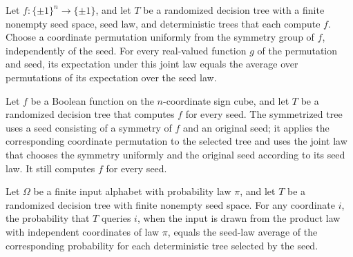 \begin{theorem}
\label{FABL.RandomizedDecisionTree.pmfExpectation_symmetrizedSeedLaw}
\leanok
{}
Let $f:\{\pm1\}^n\to\{\pm1\}$, and let $T$ be a randomized decision tree with a finite
nonempty seed space, seed law, and deterministic trees that each compute $f$. Choose a
coordinate permutation uniformly from the symmetry group of $f$, independently of the
seed. For every real-valued function $g$ of the permutation and seed, its expectation
under this joint law equals the average over permutations of its expectation over the
seed law.
\end{theorem}

\begin{definition}
\label{FABL.RandomizedDecisionTree.symmetrization}
\leanok
{}
Let $f$ be a Boolean function on the $n$-coordinate sign cube, and let $T$ be a
randomized decision tree that computes $f$ for every seed. The symmetrized tree uses a
seed consisting of a symmetry of $f$ and an original seed; it applies the corresponding
coordinate permutation to the selected tree and uses the joint law that chooses the
symmetry uniformly and the original seed according to its seed law. It still computes
$f$ for every seed.
\end{definition}

\begin{theorem}
\label{FABL.RandomizedDecisionTree.queryProbability_eq_seed_deterministicQueryProbability}
\leanok
{}
Let $\Omega$ be a finite input alphabet with probability law $\pi$, and let $T$ be a
randomized decision tree with finite nonempty seed space. For any coordinate $i$, the
probability that $T$ queries $i$, when the input is drawn from the product law with
independent coordinates of law $\pi$, equals the seed-law average of the corresponding
probability for each deterministic tree selected by the seed.
\end{theorem}

